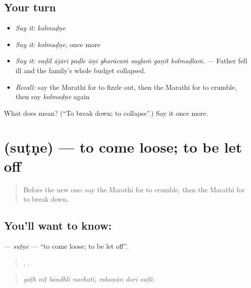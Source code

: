 \subsection*{Your turn}
\begin{itemize}
\raggedright
  \item \emph{Say it:} \emph{kolmaḍṇe}
  \item \emph{Say it:} \emph{kolmaḍṇe}, once more
  \item \emph{Say it:} \emph{vaḍīl ājārī paḍle āṇi gharācaṁ sagḷaṁ gaṇit kolmaḍlaṁ.} — Father fell ill and the family's whole budget collapsed.
  \item \emph{Recall:} say the Marathi for to fizzle out, then the Marathi for to crumble, then say \emph{kolmaḍṇe} again
\end{itemize}

\begin{tcolorbox}[breakable,colback=teal!4,colframe=teal!35!black,title={Before you move on}]
What does  mean? (\textquotedblleft{}To break down; to collapse\textquotedblright{}.) Say it once more.
\end{tcolorbox}
\section[\texorpdfstring{\mr{सुटणे} (suṭṇe)}{सुटणे (suṭṇe)}]{ (suṭṇe) — to come loose; to be let off}

\label{lesson:MR-C552-sutne}



\begin{quote}
Before the new one: say the Marathi for to crumble, then the Marathi for to break down.
\end{quote}

\subsection*{You'll want to know: }
\textbf{} — \emph{suṭṇe} — \textquotedblleft{}to come loose; to be let off\textquotedblright{}.

\begin{quote}
   ,   .
\end{quote}

\begin{quote}
\emph{gāṭh nīṭ bāndhlī navhatī, mhaṇūn dorī suṭlī.}
\end{quote}

